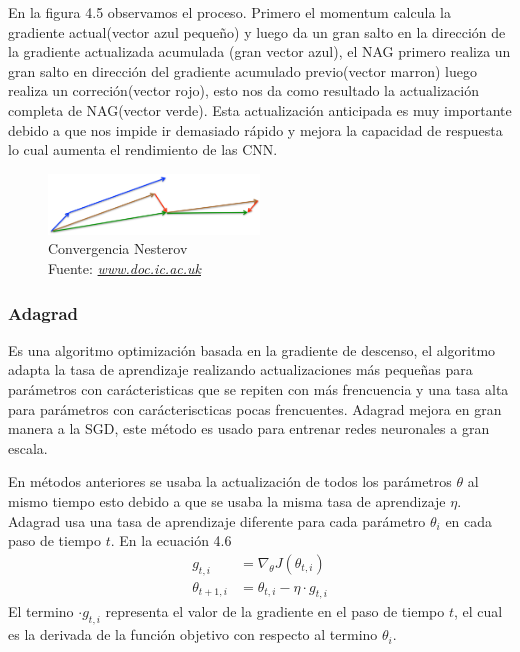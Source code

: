 En la figura 4.5 observamos el proceso. Primero el momentum calcula  la gradiente actual(vector azul pequeño)  y luego da un gran salto en la dirección de la gradiente actualizada acumulada (gran vector azul), el NAG primero realiza un gran salto en dirección del gradiente acumulado previo(vector marron) luego realiza un correción(vector rojo), esto nos da como resultado la actualización completa de NAG(vector verde). Esta actualización anticipada es muy importante debido a que nos impide ir demasiado rápido y mejora la capacidad de respuesta lo cual aumenta el rendimiento de las CNN.
\begin{figure}[H]
	\centering
	\includegraphics[width=0.5\textwidth]{Figures/nesterov.png}
	\caption{Convergencia Nesterov\\ Fuente:  \href{https://www.doc.ic.ac.uk/~js4416/163/website/neural-networks/optimisers.html}{\textit{www.doc.ic.ac.uk}}}
	\label{nesterov }
\end{figure}
\subsubsection{Adagrad}
Es una algoritmo optimización basada en la gradiente de descenso, el algoritmo adapta la tasa de aprendizaje  realizando actualizaciones más pequeñas para parámetros con carácteristicas que se repiten con más frencuencia y una tasa alta  para parámetros con carácteriscticas pocas frencuentes. Adagrad mejora en gran manera a la SGD, este método es usado para entrenar redes neuronales a gran escala. 

En métodos anteriores se usaba la actualización de todos los parámetros $\theta$ al mismo tiempo esto debido a que se usaba la misma tasa de aprendizaje $\eta $. Adagrad usa una tasa de aprendizaje diferente para cada parámetro $\theta_{i}$ en cada paso de tiempo $t$.
En la ecuación 4.6 
\begin{equation}
\label{adagrad1}
\begin{aligned}
g_{t,i}&=\nabla_{\theta} J(\theta_{t,i})\\
\theta_{t+1,i} &= \theta_{t,i} -\eta \cdot g_{t,i}
\end{aligned}
\end{equation}
El termino $\cdot g_{t,i}$ representa el valor de la gradiente en el paso de tiempo $t$, el cual es la derivada de la función objetivo con respecto al termino $\theta_{i}$.


